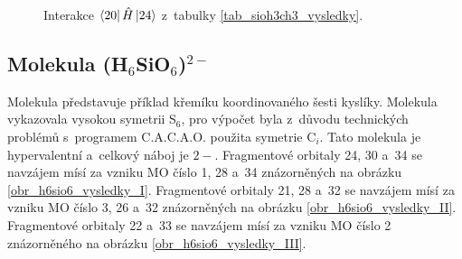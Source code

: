 \documentclass[
  printed, %
  table,   %
  lof,     %
  lot,     %
  oneside,
]{fithesis3}
\begin{document}
 
\begin{figure}
\begin{center}
\caption{Interakce $\bra{20}{\hat{H}}\ket{24}$  z~tabulky \ref{tab_sioh3ch3_vysledky}.}

\label{obr_sioh3ch3_vysledky_IV}\end{center}
\end{figure} 
  \subsection{Molekula (H$_6$SiO$_6$)$^{2-}$}
  Molekula  představuje příklad křemíku koordinovaného šesti kyslíky. Molekula vykazovala vysokou symetrii S$_6$, pro výpočet byla z~důvodu technických problémů s~programem C.A.C.A.O. použita symetrie C$_i$. Tato molekula je hypervalentní a~celkový náboj je $2-$. Fragmentové orbitaly  24, 30 a~34 se navzájem mísí za vzniku MO číslo 1, 28 a~34 znázorněných na obrázku \ref{obr_h6sio6_vysledky_I}. Fragmentové orbitaly  21, 28 a~32 se navzájem mísí za vzniku MO číslo 3, 26 a~32 znázorněných na obrázku \ref{obr_h6sio6_vysledky_II}. Fragmentové orbitaly  22 a~33 se navzájem mísí za vzniku MO číslo 2 znázorněného na obrázku \ref{obr_h6sio6_vysledky_III}. 
  
\end{document}
